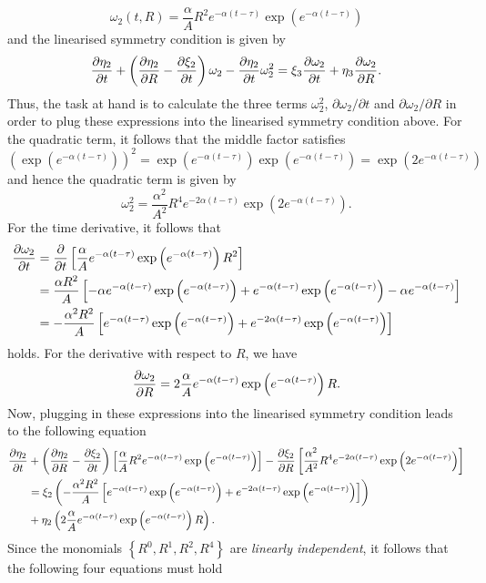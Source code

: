 $$\omega_2(t,R)=\frac{\alpha}{A}R^2e^{-\alpha(t-\tau)}\exp\left(e^{-\alpha(t-\tau)}\right)$$
and the linearised symmetry condition is given by
$$\pdv{\eta_2}{t}+\left(\pdv{\eta_2}{R}-\pdv{\xi_2}{t}\right)\omega_2-\pdv{\eta_2}{t}\omega_2^2=\xi_3\pdv{\omega_2}{t}+\eta_3\pdv{\omega_2}{R}.$$
Thus, the task at hand is to calculate the three terms $\omega_2^2$, $\partial\omega_2/\partial t$ and $\partial\omega_2/\partial R$ in order to plug these expressions into the linearised symmetry condition above. For the quadratic term, it follows that the middle factor satisfies
$$\left(\exp\left(e^{-\alpha(t-\tau)}\right)\right)^2=\exp\left(e^{-\alpha(t-\tau)}\right)\exp\left(e^{-\alpha(t-\tau)}\right)=\exp\left(2e^{-\alpha(t-\tau)}\right)$$
and hence the quadratic term is given by
$$\omega_2^2=\dfrac{\alpha^2}{A^2}R^4e^{-2\alpha(t-\tau)}\exp\left(2e^{-\alpha(t-\tau)}\right).$$
For the time derivative, it follows that
\begin{align*}
  \pdv{\omega_2}{t}&=\pdv{}{t}\left[\dfrac{\alpha}{A}e^{-\alpha(t-\tau)}\exp\left(e^{-\alpha(t-\tau)}\right)R^2\right]\\
  &=\dfrac{\alpha R^2}{A}\left[-\alpha e^{-\alpha(t-\tau)}\exp\left(e^{-\alpha(t-\tau)}\right)+e^{-\alpha(t-\tau)}\exp\left(e^{-\alpha(t-\tau)}\right)-\alpha e^{-\alpha(t-\tau)}\right]\\
  &=-\dfrac{\alpha^2R^2}{A}\left[e^{-\alpha(t-\tau)}\exp\left(e^{-\alpha(t-\tau)}\right)+e^{-2\alpha(t-\tau)}\exp\left(e^{-\alpha(t-\tau)}\right)\right]
\end{align*}
holds. For the derivative with respect to $R$, we have
$$\pdv{\omega_2}{R}=2\dfrac{\alpha}{A}e^{-\alpha(t-\tau)}\exp\left(e^{-\alpha(t-\tau)}\right)R.$$
Now, plugging in these expressions into the linearised symmetry condition leads to the following equation
\begin{align*} \pdv{\eta_2}{t}&+\left(\pdv{\eta_2}{R}-\pdv{\xi_2}{t}\right)\left[\frac{\alpha}{A}R^2e^{-\alpha(t-\tau)}\exp\left(e^{-\alpha(t-\tau)}\right)\right]-\pdv{\xi_2}{R}\left[\dfrac{\alpha^2}{A^2}R^4e^{-2\alpha(t-\tau)}\exp\left(2e^{-\alpha(t-\tau)}\right)\right]\\ &=\xi_2\left(-\dfrac{\alpha^2R^2}{A}\left[e^{-\alpha(t-\tau)}\exp\left(e^{-\alpha(t-\tau)}\right)+e^{-2\alpha(t-\tau)}\exp\left(e^{-\alpha(t-\tau)}\right)\right]\right)\\
  &+\eta_2\left(2\dfrac{\alpha}{A}e^{-\alpha(t-\tau)}\exp\left(e^{-\alpha(t-\tau)}\right)R\right).
\end{align*}
Since the monomials $\left\{R^0,R^1,R^2,R^4\right\}$ are \textit{linearly independent}, it follows that the following four equations must hold
